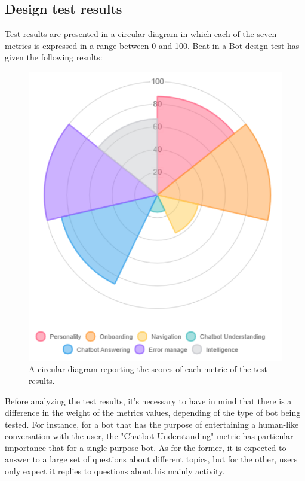 \documentclass[b5paper,10pt,twoside,cucitura]{toptesi}
\begin{document}
\subsection{Design test results}

Test results are presented in a circular diagram in which each of the seven metrics is expressed in a range between 0 and 100.
Beat in a Bot design test has given the following results: 

\begin{figure}[ht]
\centering
\includegraphics[scale=0.5]{chatbottest.png}
\caption{A circular diagram reporting the scores of each metric of the test results.}
\end{figure}


Before analyzing the test results, it's necessary to have in mind that there is a difference in the weight of the metrics values, depending of the type of bot being tested. For instance, for a bot that has the purpose of entertaining a human-like conversation with the user, the "Chatbot Understanding" metric has particular importance that for a single-purpose bot. As for the former, it is expected to answer to a large set of questions about different topics, but for the other, users only expect it replies to questions about his mainly activity.
\end{document}
